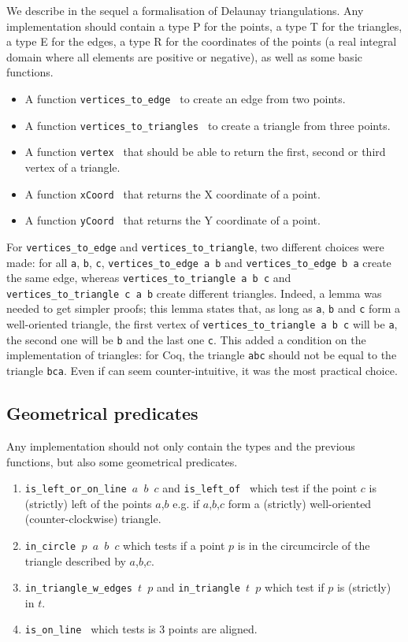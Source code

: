 \documentclass[a4paper,10pt]{article}
\def\ttt#1#2{{\tt{\color{black}#1} #2}}
\begin{document}
We describe in the sequel a formalisation of Delaunay triangulations. Any implementation should contain a type P for the points, a type T for the triangles, a type E for the edges, a type R for the coordinates of the points (a real integral domain where all elements are positive or negative), as well as some basic functions.
\begin{itemize}
\item A function \ttt{vertices\_to\_edge}{} to create an edge from two points.
\item A function \ttt{vertices\_to\_triangles}{} to create a triangle from three points.
\item A function \ttt{vertex}{}  that should be able to return the first, second or third vertex of a triangle.
\item A function \ttt{xCoord}{} that returns the X coordinate of a point.
\item A function \ttt{yCoord}{} that returns the Y coordinate of a point.
\end{itemize}

For {\tt vertices\_to\_edge} and {\tt vertices\_to\_triangle}, two different choices were made:
for all {\tt a}, {\tt b}, {\tt c}, {\tt vertices\_to\_edge a b} and {\tt vertices\_to\_edge b a} create the same edge, whereas {\tt vertices\_to\_triangle a b c} and {\tt vertices\_to\_triangle c a b} create different triangles. Indeed, a lemma was needed to get simpler proofs; this lemma states that, as long as {\tt a}, {\tt b} and {\tt c} form a well-oriented triangle, the first vertex of {\tt vertices\_to\_triangle a b c} will be {\tt a}, the second one will be {\tt b} and the last one {\tt c}. This added a condition on the implementation of triangles: for {\sc Coq}, the triangle {\tt abc} should not be equal to the triangle {\tt bca}. Even if can seem counter-intuitive, it was the most practical choice. 


\subsection{Geometrical predicates}
\label{predicate}
Any implementation should not only contain the types and the previous functions, but also some geometrical predicates.
\begin{enumerate}
\item \ttt{is\_left\_or\_on\_line}{$a$ $b$ $c$} and \ttt{is\_left\_of}{} which test if the point $c$ is (strictly) left of the points $a$,$b$ e.g. if $a$,$b$,$c$ form a (strictly) well-oriented (counter-clockwise) triangle.
\item \ttt{in\_circle}{$p$ $a$ $b$ $c$} which tests if a point $p$ is in the circumcircle of the triangle described by $a$,$b$,$c$.
\item \ttt{in\_triangle\_w\_edges}{$t$ $p$} and \ttt{in\_triangle}{$t$ $p$} which test if $p$ is (strictly) in $t$.
  \item \ttt{is\_on\_line}{} which tests is 3 points are aligned.

\end{enumerate}
\end{document}
